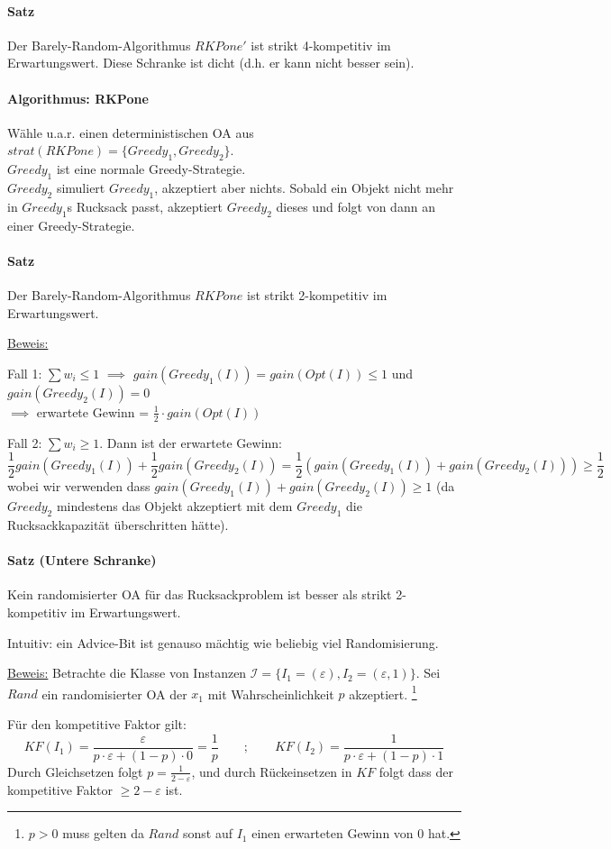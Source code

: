 \paragraph{Satz}
Der Barely-Random-Algorithmus $RKPone'$ ist strikt 4-kompetitiv im Erwartungswert.
Diese Schranke ist dicht (d.h. er kann nicht besser sein).

\paragraph{Algorithmus: RKPone}
Wähle u.a.r. einen deterministischen OA aus $strat(RKPone) = \{ Greedy_1, Greedy_2 \}$.
\\
$Greedy_1$ ist eine normale Greedy-Strategie.
\\
$Greedy_2$ simuliert $Greedy_1$, akzeptiert aber nichts. Sobald ein Objekt nicht mehr in $Greedy_1$s
Rucksack passt, akzeptiert $Greedy_2$ dieses und folgt von dann an einer Greedy-Strategie.

\paragraph{Satz}
Der Barely-Random-Algorithmus $RKPone$ ist strikt 2-kompetitiv im Erwartungswert.

\underline{Beweis:}

Fall 1: $\sum w_i \leq 1$ $\implies$ $gain(Greedy_1(I)) = gain(Opt(I)) \leq 1$ und $gain(Greedy_2(I))=0$ \\
$\implies$ erwartete Gewinn = $\frac{1}{2} \cdot gain(Opt(I))$

Fall 2: $\sum w_i \geq 1$. Dann ist der erwartete Gewinn:
$$ \frac{1}{2} gain(Greedy_1(I)) + \frac{1}{2} gain(Greedy_2(I))
= \frac{1}{2} \left( gain(Greedy_1(I)) + gain(Greedy_2(I)) \right) \geq \frac{1}{2} $$
wobei wir verwenden dass $gain(Greedy_1(I)) + gain(Greedy_2(I)) \geq 1$
(da $Greedy_2$ mindestens das Objekt akzeptiert mit dem $Greedy_1$ die Rucksackkapazität überschritten hätte).

\paragraph{Satz (Untere Schranke)}
Kein randomisierter OA für das Rucksackproblem ist besser als strikt 2-kompetitiv im Erwartungswert.

Intuitiv: ein Advice-Bit ist genauso mächtig wie beliebig viel Randomisierung.

\underline{Beweis:}
Betrachte die Klasse von Instanzen $\mathcal{I} = \{ I_1=(\varepsilon ), I_2=(\varepsilon , 1) \} $.
Sei $Rand$ ein randomisierter OA der $x_1$ mit Wahrscheinlichkeit $p$ akzeptiert.
\footnote{$p>0$ muss gelten da $Rand$ sonst auf $I_1$ einen erwarteten Gewinn von 0 hat.}

Für den kompetitive Faktor gilt:
$$
KF(I_1) = \frac{\varepsilon}{p \cdot \varepsilon + (1-p) \cdot 0} = \frac{1}{p} \qquad ; \qquad
KF(I_2) = \frac{1}{p \cdot \varepsilon + (1-p) \cdot 1} $$
Durch Gleichsetzen folgt $ p = \frac{1}{2 - \varepsilon} $, und durch Rückeinsetzen in $KF$ folgt
dass der kompetitive Faktor $\geq 2 - \varepsilon$ ist.
